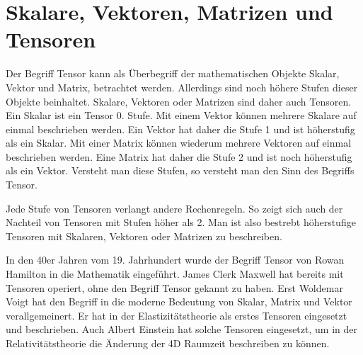 \section{Skalare, Vektoren, Matrizen und Tensoren\label{spannung:section:Skalare,_Vektoren,_Matrizen_und_Tensoren}}
Der Begriff Tensor kann als Überbegriff der mathematischen Objekte Skalar, Vektor und Matrix, betrachtet werden.
Allerdings sind noch höhere Stufen dieser Objekte beinhaltet.
Skalare, Vektoren oder Matrizen sind daher auch Tensoren.
Ein Skalar ist ein Tensor 0. Stufe.
Mit einem Vektor können mehrere Skalare auf einmal beschrieben werden.
Ein Vektor hat daher die Stufe 1 und ist höherstufig als ein Skalar.
Mit einer Matrix können wiederum mehrere Vektoren auf einmal beschrieben werden.
Eine Matrix hat daher die Stufe 2 und ist noch höherstufig als ein Vektor.
Versteht man diese Stufen, so versteht man den Sinn des Begriffs Tensor.

Jede Stufe von Tensoren verlangt andere Rechenregeln.
So zeigt sich auch der Nachteil von Tensoren mit Stufen höher als 2.
Man ist also bestrebt höherstufige Tensoren mit Skalaren, Vektoren oder Matrizen zu beschreiben.

In den 40er Jahren vom 19. Jahrhundert wurde der Begriff Tensor von Rowan Hamilton in die Mathematik eingeführt.
James Clerk Maxwell hat bereits mit Tensoren operiert, ohne den Begriff Tensor gekannt zu haben.
Erst Woldemar Voigt hat den Begriff in die moderne Bedeutung von Skalar, Matrix und Vektor verallgemeinert.
Er hat in der Elastizitätstheorie als erstes Tensoren eingesetzt und beschrieben.
Auch Albert Einstein hat solche Tensoren eingesetzt,
um in der Relativitätstheorie die Änderung der 4D Raumzeit beschreiben zu können.
\cite{spannung:Tensor}

